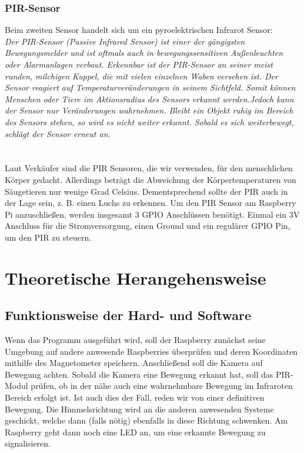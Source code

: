 \message{ !name(Verteilte Überwachung.tex)}\documentclass[12pt,a4paper]{scrreprt}
\begin{document}
\subsection{PIR-Sensor}
Beim zweiten Sensor handelt sich um ein pyroelektrischen Infrarot Sensor:\\
\textit{Der PIR-Sensor (Passive Infrared Sensor) ist einer der gängigsten Bewegungsmelder
und ist oftmals auch in bewegungssensitiven Außenleuchten oder Alarmanlagen verbaut.
Erkennbar ist der PIR-Sensor an seiner meist runden, milchigen Kuppel, die mit
vielen einzelnen Waben versehen ist. Der Sensor reagiert auf
Temperaturveränderungen in seinem Sichtfeld. Somit können Menschen oder Tiere
im Aktionsradius des Sensors erkannt werden.Jedoch kann der Sensor nur Veränderungen wahrnehmen. 
Bleibt ein Objekt ruhig im Bereich des Sensors stehen, so wird
es nicht weiter erkannt. Sobald es sich weiterbewegt, schlägt der Sensor erneut an.}\cite[S. 493]{Raspi}\\ \\
\\
Laut Verkäufer sind die PIR Sensoren, die wir verwenden, für den menschlichen Körper gedacht.
Allerdings beträgt die Abweichung der Körpertemperaturen von Säugetieren nur wenige Grad Celsius.
Dementsprechend sollte der PIR auch in der Lage sein, z. B. einen Luchs zu erkennen.
Um den PIR Sensor am Raspberry Pi anzuschließen, werden insgesamt 3 GPIO Anschlüssen benötigt.
Einmal ein 3V Anschluss für die Stromversorgung, einen Ground und ein regulärer GPIO Pin, um den PIR zu steuern.

\chapter{Theoretische Herangehensweise}
\section{Funktionsweise der Hard- und Software}
Wenn das Programm ausgeführt wird, soll der Raspberry zunächst seine Umgebung auf andere anwesende Raspberries überprüfen und deren Koordinaten mithilfe des Magnetometer speichern. Anschließend soll die Kamera auf Bewegung achten. Sobald die Kamera eine Bewegung erkannt hat, soll das PIR-Modul prüfen, ob in der nähe auch eine wahrnehmbare Bewegung im Infraroten Bereich erfolgt ist. Ist auch dies der Fall, reden wir von einer definitiven Bewegung. Die Himmelsrichtung wird an die anderen anwesenden Systeme geschickt, welche dann (falls nötig) ebenfalls in diese Richtung schwenken. Am Raspberry geht dann noch eine LED an, um eine erkannte Bewegung zu signalisieren. 
\end{document}
